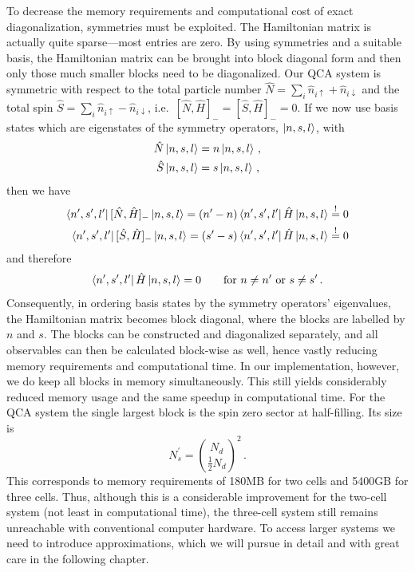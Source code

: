 %
To decrease the memory requirements and computational cost of
exact diagonalization, symmetries must be exploited. The Hamiltonian matrix is
actually quite sparse---most entries are zero. By using symmetries and a
suitable basis, the Hamiltonian matrix can be brought into block diagonal form
and then only those much smaller blocks need to be diagonalized. Our QCA system
is symmetric with respect to the total particle number $\hat{N} = \sum_i
\hat{n}_{i\uparrow} + \hat{n}_{i\downarrow}$ and the total spin $\hat{S} =
\sum_i \hat{n}_{i\uparrow} - \hat{n}_{i\downarrow}$, i.e.\ $[\hat{N},\hat{H}]_-
= [\hat{S},\hat{H}]_- = 0$. If we now use basis states which are eigenstates of
the symmetry operators, $\left|n,s,l\right>$, with
%
\begin{equation}
\begin{split}
  \hat{N} \left|n,s,l\right> &= n \left|n,s,l\right> \, , \\
  \hat{S} \left|n,s,l\right> &= s \left|n,s,l\right> \, ,
\end{split}
\end{equation}
%
then we have
%
\begin{equation}
\begin{split}
  \left<n^{\prime},s^{\prime},l^{\prime}\right| [\hat{N},\hat{H}]_- \left|n,s,l\right> = 
  (n^{\prime} - n) \left<n^{\prime},s^{\prime},l^{\prime}\right| \hat{H} \left|n,s,l\right>
  \stackrel{!}{=} 0 \\
  \left<n^{\prime},s^{\prime},l^{\prime}\right| [\hat{S},\hat{H}]_- \left|n,s,l\right> = 
  (s^{\prime} - s) \left<n^{\prime},s^{\prime},l^{\prime}\right| \hat{H} \left|n,s,l\right>
  \stackrel{!}{=} 0
\end{split}
\end{equation}
%
and therefore
%
\begin{equation}
  \left<n^{\prime},s^{\prime},l^{\prime}\right| \hat{H} \left|n,s,l\right> = 0 \qquad
  \textrm{for } n \ne n^{\prime} \textrm{ or } s \ne s^{\prime} \, .
\end{equation}
%
Consequently, in ordering basis states by the symmetry operators' eigenvalues,
the Hamiltonian matrix becomes block diagonal, where the blocks are labelled by
$n$ and $s$. The blocks can be constructed and diagonalized separately, and all
observables can then be calculated block-wise as well, hence vastly reducing
memory requirements and computational time. In our implementation, however, we
do keep all blocks in memory simultaneously. This still yields considerably
reduced memory usage and the same speedup in computational time. For the QCA system
the single largest block is the spin zero sector at half-filling. Its size is
%
\begin{equation}
  N_s^{\prime} = \binom{N_d}{\frac{1}{2} N_d}^2 \, .
\end{equation}
%
This corresponds to memory requirements of 180MB for two cells and 5400GB for
three cells. Thus, although this is a considerable improvement for the two-cell
system (not least in computational time), the three-cell system still remains
unreachable with conventional computer hardware. To access larger systems we
need to introduce approximations, which we will pursue in detail and with great
care in the following chapter.

